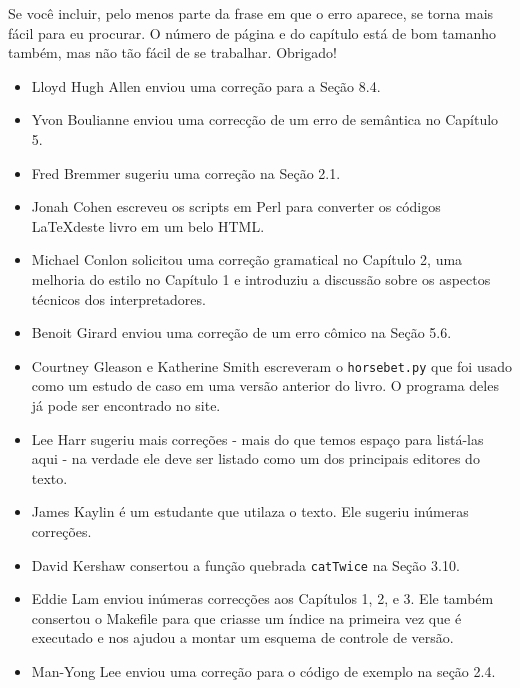\documentclass[10pt]{book}
\begin{document}
Se você incluir, pelo menos parte da frase em que o
erro aparece, se torna mais fácil para eu procurar. O número de página e
do capítulo está de bom tamanho também, mas não tão fácil de se trabalhar.
Obrigado!

\begin {itemize}

\small
\item Lloyd Hugh Allen enviou uma correção para a Seção 8.4.

\item Yvon Boulianne enviou uma correcção de um erro de semântica no
Capítulo 5.

\item Fred Bremmer sugeriu uma correção na Seção 2.1.

\item Jonah Cohen escreveu os scripts em Perl para converter os
códigos \LaTeX deste livro em um belo HTML.

\item Michael Conlon solicitou uma correção gramatical no Capítulo 2,
uma melhoria do estilo no Capítulo 1 e introduziu a discussão
sobre os aspectos técnicos dos interpretadores.

\item Benoit Girard enviou uma
correção de um erro cômico na Seção 5.6.

\item Courtney Gleason e Katherine Smith escreveram o {\tt horsebet.py}
que foi usado como um estudo de caso em uma versão anterior do livro. O
programa deles já pode ser encontrado no site.

\item Lee Harr sugeriu mais correções - mais do que temos espaço para listá-las
aqui - na verdade ele deve ser listado como um dos principais editores
do texto.

\item James Kaylin é um estudante que utilaza o texto. Ele sugeriu
inúmeras correções.

\item David Kershaw consertou a função quebrada {\tt catTwice} na Seção
3.10.

\item Eddie Lam enviou inúmeras correcções aos Capítulos 
1, 2, e 3.
Ele também consertou o Makefile para que criasse um índice na primeira vez que é
executado e nos ajudou a montar um esquema de controle de versão.  

\item Man-Yong Lee enviou uma correção para o código de exemplo na
seção 2.4.  


\end{itemize}
\end{document}
